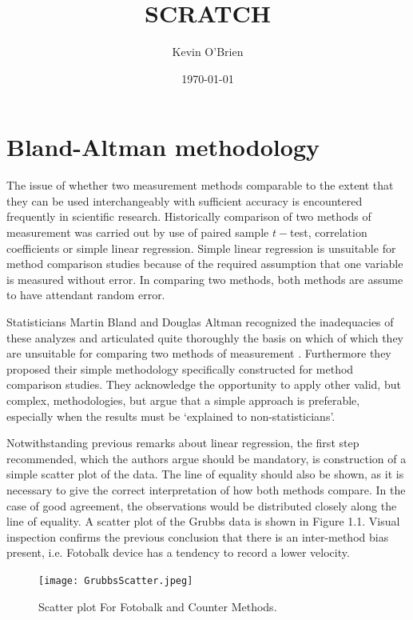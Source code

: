 \documentclass[12pt, a4paper]{report}
\begin{document}
	\author{Kevin O'Brien}
	\title{SCRATCH}
	\date{\today}

	
	\tableofcontents \setcounter{tocdepth}{2}
	\section{Bland-Altman methodology}
	The issue of whether two measurement methods comparable to the
	extent that they can be used interchangeably with sufficient
	accuracy is encountered frequently in scientific research.
	Historically comparison of two methods of measurement was carried
	out by use of paired sample $t-$test, correlation coefficients or
	simple linear regression. Simple linear regression is unsuitable for method comparison studies because of the required assumption that one variable is measured without error. In comparing two methods, both methods are assume to have attendant random error.
	
	Statisticians Martin Bland and Douglas Altman recognized the inadequacies of these analyzes and
	articulated quite thoroughly the basis on which of which they are unsuitable for comparing two methods of measurement \citep*{BA83}. Furthermore they proposed their simple methodology specifically
	constructed for method comparison studies. They acknowledge the opportunity to apply other valid, but complex, methodologies, but argue that a simple approach is preferable, especially when the
	results must be `explained to non-statisticians'.
	
	Notwithstanding previous remarks about linear regression, the first step recommended, which the authors argue should be mandatory, is construction of a simple scatter plot of the data. The line of equality should also be shown, as it is necessary to give the correct interpretation of how both methods compare. In the case of good agreement, the observations would be distributed closely along the line of equality. A scatter plot of the Grubbs data is shown in Figure 1.1. Visual inspection confirms the previous conclusion that there is an inter-method bias present, i.e. Fotobalk device has a tendency to record a lower velocity.
	
	\begin{figure}[h!]
		\begin{center}
			\texttt{[image: GrubbsScatter.jpeg]}
			\caption{Scatter plot For Fotobalk and Counter Methods.}\label{GrubbsScatter}
		\end{center}
	\end{figure}
	
\end{document}
